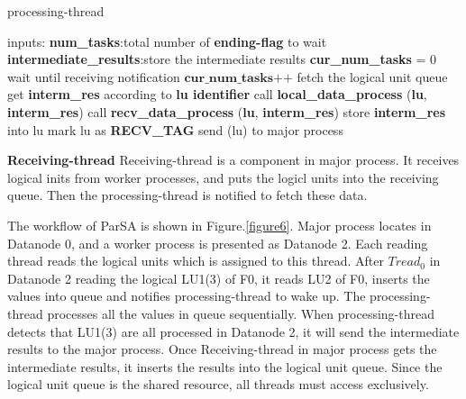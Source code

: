 \documentclass[preprint,12pt]{elsarticle}
\begin{document}
\begin{algorithm}[htb]
\caption{processing-thread} 
\label{alg:processing-thread}
\begin{algorithmic}
\STATE inputs:
\STATE \textbf{num\_tasks}:total number of \textbf{ending-flag} to wait
\STATE \textbf{intermediate\_results}:store the intermediate results
\newline
\STATE \textbf{cur\_num\_tasks} = 0
\STATE wait until receiving notification
\STATE $\textbf{cur\_num\_tasks++}$
\STATE fetch the logical unit queue
\STATE get \textbf{interm\_res} according to \textbf{lu identifier} 
\STATE call \textbf{local\_data\_process} (\textbf{lu}, \textbf{interm\_res})
\ENDIF
{}
\STATE call \textbf{recv\_data\_process} (\textbf{lu}, \textbf{interm\_res}) 
\ENDIF
{}
\STATE store \textbf{interm\_res} into lu
\STATE mark lu as \textbf{RECV\_TAG}
\STATE send (lu) to major process
\ENDIF
\ENDIF
\ENDFOR
\ENDIF
\ENDWHILE
\end{algorithmic}
\end{algorithm}

\textbf{Receiving-thread} Receiving-thread is a component in major process. It receives logical inits from worker processes, and
puts the logicl units into the receiving queue. Then the processing-thread is notified to fetch these data. \par
The workflow of ParSA is shown in Figure.\ref{figure6}. Major process locates in Datanode 0, and a worker process is presented as 
Datanode 2. Each reading thread reads the logical units which is assigned to this thread. After $Tread_0$ in Datanode 2 reading the 
logical LU1(3) of F0, it reads LU2 of F0, inserts the values into queue and notifies processing-thread to wake up. The processing-thread 
processes all the values in queue sequentially. When processing-thread detects that LU1(3) are all processed in Datanode 2, it will 
send the intermediate results to the major process. Once Receiving-thread in major process gets the intermediate results, it inserts the results into the logical unit queue. Since the logical unit queue is the shared resource, all threads must access exclusively. \par
\end{document}
